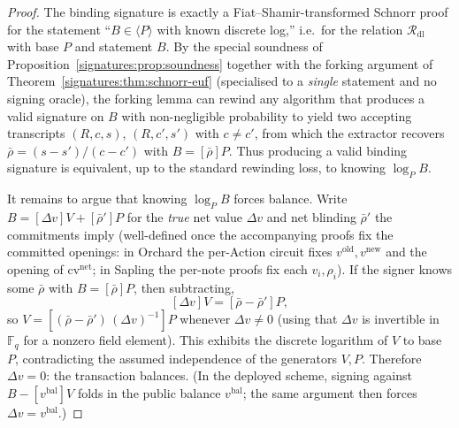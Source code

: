 \documentclass[11pt,a4paper]{article}
\theoremstyle{definition}
\theoremstyle{remark}
\newcommand{\Fq}{\ensuremath{\mathbb{F}_{q}}}
\begin{document}
\begin{proof}
The binding signature is exactly a Fiat--Shamir-transformed Schnorr proof for the statement ``\(B \in \langle P\rangle\) with known discrete log,'' i.e.\ for the relation \(\mathcal{R}_{\mathrm{dl}}\) with base \(P\) and statement \(B\). By the special soundness of Proposition~\ref{signatures:prop:soundness} together with the forking argument of Theorem~\ref{signatures:thm:schnorr-euf} (specialised to a \emph{single} statement and no signing oracle), the forking lemma can rewind any algorithm that produces a valid signature on \(B\) with non-negligible probability to yield two accepting transcripts \((R, c, s)\), \((R, c', s')\) with \(c \ne c'\), from which the extractor recovers \(\bar\rho = (s - s')/(c - c')\) with \(B = [\bar\rho]P\). Thus producing a valid binding signature is equivalent, up to the standard rewinding loss, to knowing \(\log_P B\). 

It remains to argue that knowing \(\log_P B\) forces balance. Write \(B = [\Delta v]V + [\bar\rho']P\) for the \emph{true} net value \(\Delta v\) and net blinding \(\bar\rho'\) the commitments imply (well-defined once the accompanying proofs fix the committed openings: in Orchard the per-Action circuit fixes \(v^{\mathrm{old}}, v^{\mathrm{new}}\) and the opening of \(\mathrm{cv}^{\mathrm{net}}\); in Sapling the per-note proofs fix each \(v_i, \rho_i\)). If the signer knows some \(\bar\rho\) with \(B = [\bar\rho]P\), then subtracting,
\[
  [\Delta v]V = [\bar\rho - \bar\rho']P,
\]
so \(V = [(\bar\rho - \bar\rho')\,(\Delta v)^{-1}]P\) whenever \(\Delta v \ne 0\) (using that \(\Delta v\) is invertible in \(\Fq\) for a nonzero field element). This exhibits the discrete logarithm of \(V\) to base \(P\), contradicting the assumed independence of the generators \(V, P\). Therefore \(\Delta v = 0\): the transaction balances. (In the deployed scheme, signing against \(B - [v^{\mathrm{bal}}]V\) folds in the public balance \(v^{\mathrm{bal}}\); the same argument then forces \(\Delta v = v^{\mathrm{bal}}\).)
\end{proof}
\end{document}
